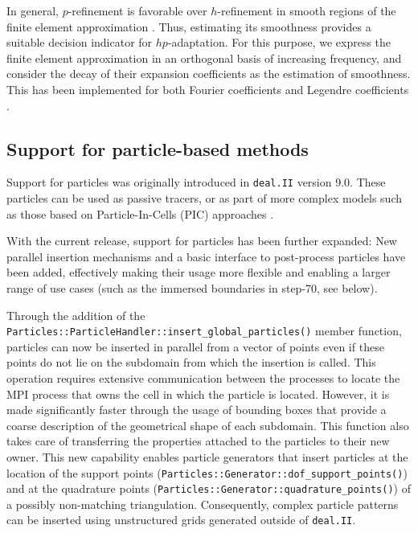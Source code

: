 \documentclass{ansarticle-preprint}
\newcommand{\specialword}[1]{\texttt{#1}}
\newcommand{\dealii}{{\specialword{deal.II}}\xspace}
\begin{document}
In general, $p$-refinement is favorable over $h$-refinement in smooth regions of
the finite element approximation \cite[Thm.~3.4]{BabuskaSuri1990}. Thus, estimating
its smoothness provides a suitable decision indicator for $hp$-adaptation. For this
purpose, we express the finite element approximation in an orthogonal
basis of increasing frequency, and consider the decay of their expansion
coefficients as the estimation of smoothness. This has been implemented for both
Fourier coefficients \cite{BangerthKayserHerold2007} and Legendre coefficients
\cite{Mavriplis1994,HoustonSeniorSueli2003,HoustonSueli2005,EibnerMelenk2007}.


\subsection{Support for particle-based methods}
\label{subsec:particles}

Support for particles was originally introduced in \dealii{} version 9.0. These
particles can be used as passive tracers, or as part of more complex
models such as those based on Particle-In-Cells (PIC) approaches \cite{GLHPB18}.

With the current release, support for particles has been further expanded: New parallel
insertion mechanisms and a basic interface to post-process particles have
been added, effectively making their usage more flexible and enabling a larger
range of use cases (such as the immersed boundaries in step-70, see below).

Through the addition of the \texttt{Particles::ParticleHandler::insert\_global\_particles()} member function,
particles can now be inserted in parallel from a vector of points even if these points do not lie
on the subdomain from which the insertion is called. This operation requires extensive
communication between the processes to locate   the MPI process that
owns the cell in which the particle
is located. However, it is made significantly faster  through the usage of bounding boxes
that provide a coarse description of the geometrical shape of each subdomain.
This function also takes care of transferring the properties attached to the particles to their new owner.
This new capability enables particle generators that insert particles at the location
of the support points (\texttt{Particles::Generator::dof\_support\_points()}) and at the quadrature points (\texttt{Particles::Generator::quadrature\_points()}) of a
possibly non-matching triangulation. Consequently, complex particle patterns can be inserted
using unstructured grids generated outside of \dealii{}.
\end{document}
